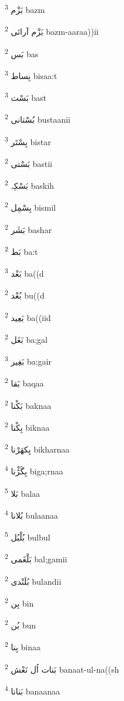 \documentclass[12pt]{article}
\begin{document}
\begin{multicols}{5}
{\ur بَزْم}   \textsuperscript{3} bazm

{\ur بَزْم آرائی}   \textsuperscript{2} bazm-aaraa))ii

{\ur بَس}   \textsuperscript{2} bas

{\ur بِساط}   \textsuperscript{3} bisaa:t

{\ur بَسْت}   \textsuperscript{3} bast

{\ur بُسْتانی}   \textsuperscript{2} bustaanii

{\ur بِسْتَر}   \textsuperscript{3} bistar

{\ur بَسْتی}   \textsuperscript{2} bastii

{\ur بَسْکِہ}   \textsuperscript{2} baskih

{\ur بِسْمِل}   \textsuperscript{2} bismil

{\ur بَشَر}   \textsuperscript{2} bashar

{\ur بَط}   \textsuperscript{2} ba:t

{\ur بَعْد}   \textsuperscript{3} ba((d

{\ur بُعْد}   \textsuperscript{2} bu((d

{\ur بَعِید}   \textsuperscript{2} ba((iid

{\ur بَغَل}   \textsuperscript{2} ba;gal

{\ur بَغِیر}   \textsuperscript{3} ba;gair

{\ur بَقا}   \textsuperscript{2} baqaa

{\ur بَکْنا}   \textsuperscript{2} baknaa

{\ur بِکْنا}   \textsuperscript{2} biknaa

{\ur بِکھَرْنا}   \textsuperscript{2} bikharnaa

{\ur بِگَڑْنا}   \textsuperscript{4} biga;rnaa

{\ur بَلا}   \textsuperscript{5} balaa

{\ur بُلانا}   \textsuperscript{4} bulaanaa

{\ur بُلْبُل}   \textsuperscript{5} bulbul

{\ur بَلْغَمی}   \textsuperscript{2} bal;gamii

{\ur بُلَنْدی}   \textsuperscript{2} bulandii

{\ur بِن}   \textsuperscript{2} bin

{\ur بُن}   \textsuperscript{2} bun

{\ur بِنا}   \textsuperscript{2} binaa

{\ur بَنات اُل نَعْش}   \textsuperscript{2} banaat-ul-na((sh

{\ur بَنانا}   \textsuperscript{4} banaanaa


\end{multicols}
\end{document}
